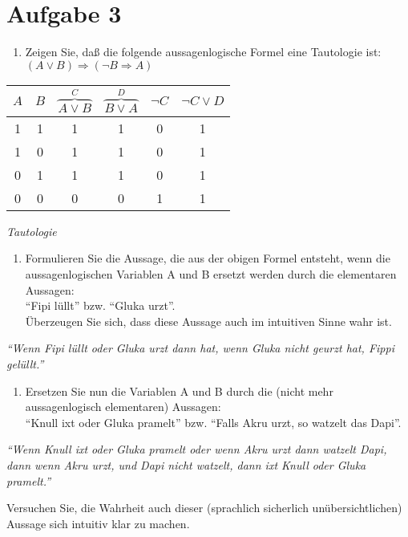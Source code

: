 \section*{Aufgabe 3}

\begin{enumerate}[label={a)}, leftmargin=*]
\item Zeigen Sie, daß die folgende aussagenlogische Formel eine Tautologie ist:\\
$(A \lor B) \Rightarrow (\lnot B \Rightarrow A)$
\end{enumerate}

\begin{table}[h]
\centering
\begin{tabular}{c|c|c|c|c|c}
$A$ & $B$ & $\overbrace{A \lor B}^{C}$ & $\overbrace{B \lor A}^{D}$ & $\lnot C$ & $\lnot C \lor D$\\
\hline
1 & 1 & 1 & 1 & 0 & 1\\
1 & 0 & 1 & 1 & 0 & 1\\
0 & 1 & 1 & 1 & 0 & 1\\
0 & 0 & 0 & 0 & 1 & 1\\
\end{tabular}
\end{table}

\textit{Tautologie}

\begin{enumerate}[label={b)}, leftmargin=*]
\item Formulieren Sie die Aussage, die aus der obigen Formel entsteht, wenn die aussagenlogischen Variablen A und B ersetzt werden durch die elementaren Aussagen:\\
    ``Fipi lüllt'' bzw. ``Gluka urzt''.\\
    Überzeugen Sie sich, dass diese Aussage auch im intuitiven Sinne wahr ist.
\end{enumerate}

\textit{``Wenn Fipi lüllt oder Gluka urzt dann hat, wenn Gluka nicht geurzt hat, Fippi gelüllt.''}

\begin{enumerate}[label={c)}, leftmargin=*]
\item Ersetzen Sie nun die Variablen A und B durch die (nicht mehr aussagenlogisch elementaren)
Aussagen:\\
``Knull ixt oder Gluka pramelt'' bzw. ``Falls Akru urzt, so watzelt das Dapi''.
\end{enumerate}

\textit{``Wenn Knull ixt oder Gluka pramelt oder wenn Akru urzt dann watzelt Dapi, dann wenn Akru urzt, und Dapi nicht watzelt, dann ixt Knull oder Gluka pramelt.''}

Versuchen Sie, die Wahrheit auch dieser (sprachlich sicherlich unübersichtlichen) Aussage sich intuitiv klar zu machen.